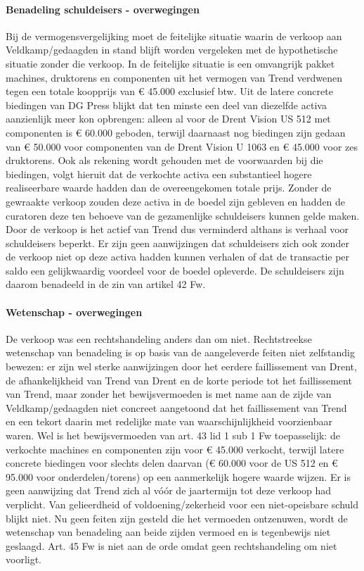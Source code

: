 \documentclass[
  dutch,
  a4paper,
]{article}
\begin{document}
\paragraph{Benadeling schuldeisers - overwegingen}\label{benadeling-schuldeisers---overwegingen-70}

Bij de vermogensvergelijking moet de feitelijke situatie waarin de verkoop aan Veldkamp/gedaagden in stand blijft worden vergeleken met de hypothetische situatie zonder die verkoop. In de feitelijke situatie is een omvangrijk pakket machines, druktorens en componenten uit het vermogen van Trend verdwenen tegen een totale koopprijs van € 45.000 exclusief btw. Uit de latere concrete biedingen van DG Press blijkt dat ten minste een deel van diezelfde activa aanzienlijk meer kon opbrengen: alleen al voor de Drent Vision US 512 met componenten is € 60.000 geboden, terwijl daarnaast nog biedingen zijn gedaan van € 50.000 voor componenten van de Drent Vision U 1063 en € 45.000 voor zes druktorens. Ook als rekening wordt gehouden met de voorwaarden bij die biedingen, volgt hieruit dat de verkochte activa een substantieel hogere realiseerbare waarde hadden dan de overeengekomen totale prijs. Zonder de gewraakte verkoop zouden deze activa in de boedel zijn gebleven en hadden de curatoren deze ten behoeve van de gezamenlijke schuldeisers kunnen gelde maken. Door de verkoop is het actief van Trend dus verminderd althans is verhaal voor schuldeisers beperkt. Er zijn geen aanwijzingen dat schuldeisers zich ook zonder de verkoop niet op deze activa hadden kunnen verhalen of dat de transactie per saldo een gelijkwaardig voordeel voor de boedel opleverde. De schuldeisers zijn daarom benadeeld in de zin van artikel 42 Fw.

\paragraph{Wetenschap - overwegingen}\label{wetenschap---overwegingen-70}

De verkoop was een rechtshandeling anders dan om niet. Rechtstreekse wetenschap van benadeling is op basis van de aangeleverde feiten niet zelfstandig bewezen: er zijn wel sterke aanwijzingen door het eerdere faillissement van Drent, de afhankelijkheid van Trend van Drent en de korte periode tot het faillissement van Trend, maar zonder het bewijsvermoeden is met name aan de zijde van Veldkamp/gedaagden niet concreet aangetoond dat het faillissement van Trend en een tekort daarin met redelijke mate van waarschijnlijkheid voorzienbaar waren. Wel is het bewijsvermoeden van art. 43 lid 1 sub 1 Fw toepasselijk: de verkochte machines en componenten zijn voor € 45.000 verkocht, terwijl latere concrete biedingen voor slechts delen daarvan (€ 60.000 voor de US 512 en € 95.000 voor onderdelen/torens) op een aanmerkelijk hogere waarde wijzen. Er is geen aanwijzing dat Trend zich al vóór de jaartermijn tot deze verkoop had verplicht. Van gelieerdheid of voldoening/zekerheid voor een niet-opeisbare schuld blijkt niet. Nu geen feiten zijn gesteld die het vermoeden ontzenuwen, wordt de wetenschap van benadeling aan beide zijden vermoed en is tegenbewijs niet geslaagd. Art. 45 Fw is niet aan de orde omdat geen rechtshandeling om niet voorligt.
\end{document}
